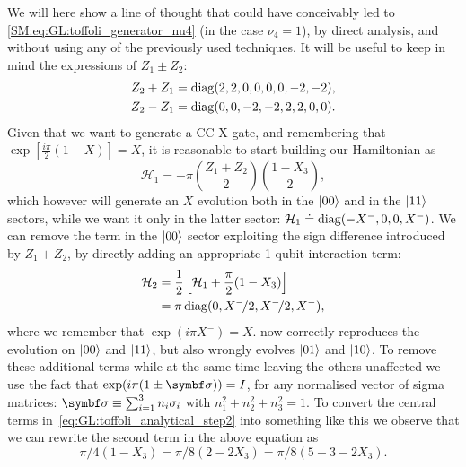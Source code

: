 We will here show a line of thought that could have conceivably led to \cref{SM:eq:GL:toffoli_generator_nu4} (in the case $\nu_4=1$), by direct analysis, and without using any of the previously used techniques.
It will be useful to keep in mind the expressions of $Z_1 \pm Z_2$:
\begin{equation}
\begin{aligned}
	Z_2 + Z_1 &= \operatorname{diag}(2, 2, 0, 0, 0, 0, -2, -2), \\
	Z_2 - Z_1 &= \operatorname{diag}(0, 0, -2, -2, 2, 2, 0, 0).
\end{aligned}
\end{equation}
Given that we want to generate a CC-X gate, and remembering that
$\exp\left[\frac{i\pi}{2}(1-X)\right] = X$, it is reasonable to start building our Hamiltonian as
\begin{equation}
	\mathcal H_1 = - \pi \left(\frac{Z_1+Z_2}{2}\right)\left(\frac{1-X_3}{2}\right),
\end{equation}
which however will generate an $X$ evolution both in the $\ket{00}$ and in the $\ket{11}$ sectors, while we want it only in the latter sector:
	$\mathcal H_1 \doteq \operatorname{diag}(-X^-, 0, 0, X^-)$.
We can remove the term in the $\ket{00}$ sector exploiting the sign difference introduced by $Z_1 + Z_2$, by directly adding an appropriate 1-qubit interaction term:
\begin{equation}
\begin{aligned}
	\mathcal H_2 &= \frac{1}{2} \left[ \mathcal H_1 + \frac{\pi}{2} (1 - X_3) \right] \\
				 &= \pi \operatorname{diag}(0, X^-\!/2, X^-\!/2, X^-),
\end{aligned}
\label{eq:GL:toffoli_analytical_step2}
\end{equation}
where we remember that $\exp(i\pi X^-) = X$.
 now correctly reproduces the evolution on $\ket{00}$ and $\ket{11}$, but also wrongly evolves $\ket{01}$ and $\ket{10}$.
To remove these additional terms while at the same time leaving the others unaffected we use the fact that
$\exp(i\pi (1 \pm \bs{\sigma})) = I$, for any normalised vector of sigma matrices: $\bs\sigma \equiv \sum_{i=1}^3 n_i \sigma_i$ with $n_1^2 + n_2^2 + n_3^2 = 1$.
To convert the central terms in~\cref{eq:GL:toffoli_analytical_step2} into something like this we observe that we can rewrite the second term in the above equation as
\begin{equation}
	\pi/4(1-X_3) = \pi/8(2 - 2 X_3) = \pi/8(5 - 3 - 2 X_3).
\end{equation}

